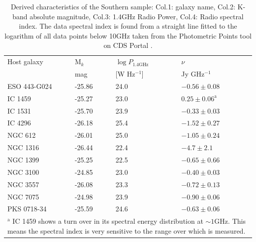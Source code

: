 	\begin{table}
		\centering
		\caption{Derived characteristics of the Southern sample: Col.1: galaxy name, Col.2: K-band absolute magnitude, Col.3: 1.4GHz Radio Power, Col.4: Radio spectral index. The data spectral index is found from a straight line fitted to the logarithm of all data points below 10GHz taken from the Photometric Points tool on CDS Portal \citep{Wenger2000}.}
		\label{tab:sampleDerived}
		\begin{tabular}{l l l l}
			\hline
			\hline
			Host galaxy	& M$_k$ & $\log P_\text{1.4GHz}$ & $\nu $ 			\\
						& mag 	& [W Hz$^{-1}$]			& Jy GHz$^{-1}$		\\
			\hline 
			ESO 443-G024 & -25.86 & 24.0 				& $-0.56 \pm 0.08$	\\
			IC 1459 	& -25.27 & 23.0 				& $0.25 \pm 0.06^\text{a}$ 	\\
			IC 1531 	& -25.70 & 23.9 				& $-0.33 \pm 0.03$ 	\\
			IC 4296		& -26.18 & 25.4 				& $-1.52 \pm 0.27$ 	\\
			NGC 612 	& -26.01 & 25.0 				& $-1.05 \pm 0.24$ 	\\
			NGC 1316 	& -26.44 & 22.4 				& $-4.7 \pm 2.1$ 	\\
			NGC 1399 	& -25.25 & 22.5 				& $-0.65 \pm 0.66$ 	\\
			NGC 3100 	& -24.85 & 23.0 				& $-0.40 \pm 0.03$ 	\\
			NGC 3557 	& -26.08 & 23.3 				& $-0.72 \pm 0.13$ 	\\
			NGC 7075 	& -24.98 & 23.9 				& $-0.90 \pm 0.06$ 	\\
			PKS 0718-34 & -25.59 & 24.6 				& $-0.63 \pm 0.06$ 	\\
			\hline
			\hline
			\multicolumn{4}{L{\textwidth}}{\footnotesize $^\text{a}$ IC 1459 shows a turn over in its spectral energy distribution at $\sim 1 \text{GHz}$. This means the spectral index is very sensitive to the range over which is measured.} \\ %

		\end{tabular}
	\end{table}
	














